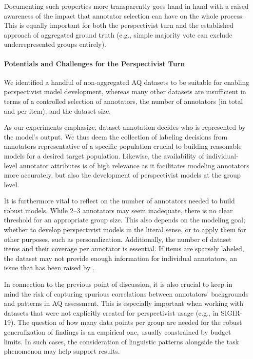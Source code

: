 Documenting such properties more transparently goes hand in hand with a raised awareness of the impact that annotator selection can have on the whole process. This is equally important for both the perspectivist turn and the established approach of aggregated ground truth (e.g., simple majority vote can exclude underrepresented groups entirely).

\paragraph{Potentials and Challenges for the Perspectivist Turn}

We identified a handful of non-aggregated AQ datasets to be suitable for enabling perspectivist model development, whereas many other datasets are insufficient in terms of a controlled selection of annotators, the number of annotators (in total and per item), and the dataset size.

As our experiments emphasize, dataset annotation decides who is represented by the model's output. We thus deem the collection of labeling decisions from annotators representative of a specific population crucial to building reasonable models for a desired target population. Likewise, the availability of individual-level annotator attributes is of high relevance as it facilitates modeling annotators more accurately, but also the development of perspectivist models at the group level.

It is furthermore vital to reflect on the number of annotators needed to build robust models. While 2--3 annotators may seem inadequate, there is no clear threshold for an appropriate group size. This also depends on the modeling goal; whether to develop perspectivist models in the literal sense, or to apply them for other purposes, such as personalization. Additionally, the number of dataset items and their coverage per annotator is essential. If items are sparsely labeled, the dataset may not provide enough information for individual annotators, an issue that has been raised by \citet{davani-etal-2022-dealing}.

In connection to the previous point of discussion, it is also crucial to keep in mind the risk of capturing spurious correlations between annotators' backgrounds and patterns in AQ assessment. This is especially important when working with datasets that were not explicitly created for perspectivist usage (e.g., in SIGIR-19). The question of how many data points per group are needed for the robust generalization of findings is an empirical one, usually constrained by budget limits. In such cases, the consideration of linguistic patterns alongside the task phenomenon may help support results.